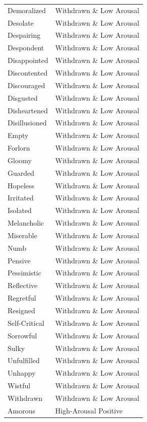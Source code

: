 \begin{longtable}{p{}p{}}
Demoralized & Withdrawn \& Low Arousal \\
Desolate & Withdrawn \& Low Arousal \\
Despairing & Withdrawn \& Low Arousal \\
Despondent & Withdrawn \& Low Arousal \\
Disappointed & Withdrawn \& Low Arousal \\
Discontented & Withdrawn \& Low Arousal \\
Discouraged & Withdrawn \& Low Arousal \\
Disgusted & Withdrawn \& Low Arousal \\
Disheartened & Withdrawn \& Low Arousal \\
Disillusioned & Withdrawn \& Low Arousal \\
Empty & Withdrawn \& Low Arousal \\
Forlorn & Withdrawn \& Low Arousal \\
Gloomy & Withdrawn \& Low Arousal \\
Guarded & Withdrawn \& Low Arousal \\
Hopeless & Withdrawn \& Low Arousal \\
Irritated & Withdrawn \& Low Arousal \\
Isolated & Withdrawn \& Low Arousal \\
Melancholic & Withdrawn \& Low Arousal \\
Miserable & Withdrawn \& Low Arousal \\
Numb & Withdrawn \& Low Arousal \\
Pensive & Withdrawn \& Low Arousal \\
Pessimistic & Withdrawn \& Low Arousal \\
Reflective & Withdrawn \& Low Arousal \\
Regretful & Withdrawn \& Low Arousal \\
Resigned & Withdrawn \& Low Arousal \\
Self-Critical & Withdrawn \& Low Arousal \\
Sorrowful & Withdrawn \& Low Arousal \\
Sulky & Withdrawn \& Low Arousal \\
Unfulfilled & Withdrawn \& Low Arousal \\
Unhappy & Withdrawn \& Low Arousal \\
Wistful & Withdrawn \& Low Arousal \\
Withdrawn & Withdrawn \& Low Arousal \\
Amorous & High-Arousal Positive \\

\end{longtable}
